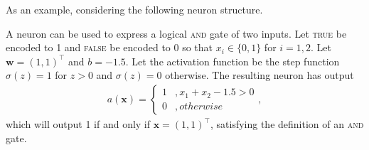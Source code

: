 
\noindent As an example, considering the following neuron structure.

\begin{example}
\label{nnets-and-eg}
A neuron can be used to express a logical \textsc{and} gate of two inputs. Let \textsc{true} be encoded to 1 and \textsc{false} be encoded to 0 so that $x_i \in \{0,1\}$ for $i=1,2$. Let $\mathbf{w} = (1, 1)^\intercal$ and $b = -1.5$. Let the activation function be the step function $\sigma(z) = 1$ for $z > 0$ and $\sigma(z) = 0$ otherwise. The resulting neuron has output
\begin{align*}
	a(\mathbf{x}) = \begin{cases}
		1 & , x_1 + x_2 - 1.5 > 0\\
		0 & , otherwise
	\end{cases},
\end{align*}
which will output 1 if and only if $\mathbf{x} = (1, 1)^\intercal$, satisfying the definition of an \textsc{and} gate.
\end{example}

